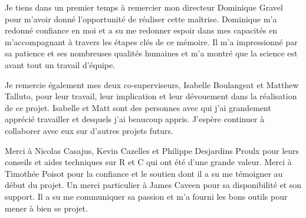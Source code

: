

\Pagetitre
\cleardoublepage






\remerciements


Je tiens dans un premier temps à remercier mon directeur Dominique Gravel pour m'avoir donné
l'opportunité de réaliser cette maîtrise. Dominique m'a redonné confiance en moi et a su me redonner
espoir dans mes capacités en m'accompagnant à travers les étapes clés de ce mémoire. Il m'a impressionné par sa patience et ses nombreuses qualités humaines et m'a montré
que la science est avant tout un travail d'équipe.

Je remercie également mes deux co-superviseurs, Isabelle Boulangeat et Matthew Talluto, pour leur
travail, leur implication et leur dévouement dans la réalisation de ce projet. Isabelle et Matt sont
des personnes avec qui j'ai grandement apprécié travailler et desquels j'ai beaucoup appris. J'espère continuer à collaborer avec eux sur d'autres projets futurs.

Merci à Nicolas Casajus, Kevin Cazelles et Philippe Desjardins Proulx pour leurs conseils et aides
techniques sur R et C qui ont été d'une grande valeur. Merci à Timothée Poisot pour la confiance et
le soutien dont il a su me témoigner au début du projet. Un merci particulier à James Caveen pour sa
disponibilité et son support. Il a su me communiquer sa passion et m'a fourni les bons outils pour
mener à bien se projet.


